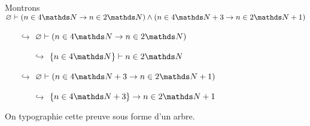 \begin{exm}
	Montrons $\O \vdash (n \in 4\N \to n \in 2\N) \land (n \in 4\N + 3 \to n \in 2\N +1)$\/
	\begin{itemize}
		\item[$\hookrightarrow$] $\O \vdash (n \in 4\N \to n \in 2\N)$\/
			\begin{itemize}
				\item[$\hookrightarrow$] $\{n \in 4\N\} \vdash n \in 2\N$\/
			\end{itemize}
		\item[$\hookrightarrow$] $\O \vdash (n \in 4\N + 3 \to n \in 2\N +1)$\/
			\begin{itemize}
				\item[$\hookrightarrow$] $\{n \in 4\N + 3\} \to n \in 2\N +1$\/
			\end{itemize}
	\end{itemize}

	On typographie cette preuve sous forme d'un arbre. 
\end{exm}


